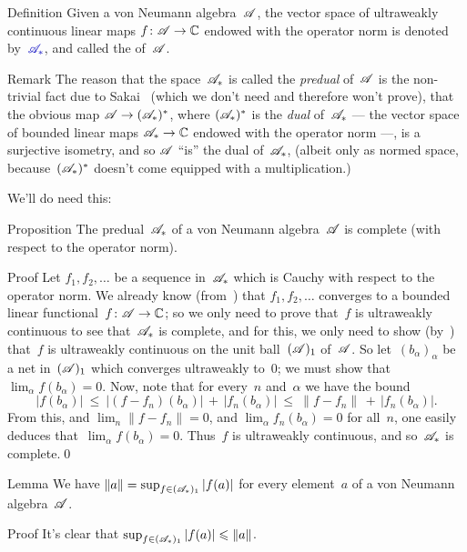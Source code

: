 \documentclass[a]{subfiles}
\begin{document}
\begin{parsec}%
\begin{point}{Definition}%
Given a von Neumann algebra~$\mathscr{A}$,
the vector space of ultraweakly continuous 
linear maps $f\colon \mathscr{A}\to \mathbb{C}$
endowed with the operator norm
is denoted by~$\Define{\scrA_*}$,
and called the  of~$\mathscr{A}$.
\begin{point}{Remark}%
The reason
that the space~$\mathscr{A}_*$ is called the \emph{predual}
of~$\mathscr{A}$
is the non-trivial fact due to Sakai~\cite{sakai} (which we 
don't need and therefore won't prove),
that the obvious 
map $\mathscr{A}\to(\mathscr{A}_*)^*$,
where $(\mathscr{A}_*)^*$ is the \emph{dual} of~$\mathscr{A}_*$ --- the
vector space of bounded linear maps $\mathscr{A}_*\to\mathbb{C}$
endowed with the operator norm ---,
is a surjective isometry,
and so $\mathscr{A}$ ``is'' the dual of~$\mathscr{A}_*$,
(albeit only as normed space,
because~$(\mathscr{A}_*)^*$ doesn't come equipped with a multiplication.)

We'll do need this:
\end{point}
\end{point}
\begin{point}{Proposition}%
The predual~$\mathscr{A}_*$ of a von Neumann algebra~$\mathscr{A}$
is complete (with respect to the operator norm).
\begin{point}{Proof}%
Let $f_1,f_2,\dotsc$ be a sequence in~$\mathscr{A}_*$
which is Cauchy with respect to the operator norm.
We already know (from~)
that $f_1,f_2,\dotsc$ converges to a bounded linear 
functional~$f\colon \mathscr{A}\to\mathbb{C}$;
so we only need to prove that~$f$ is ultraweakly continuous
to see that~$\mathscr{A}_*$ is complete,
and for this,
we only need to show 
(by~)
that~$f$
is ultraweakly continuous
on the unit ball~$(\mathscr{A})_1$ of~$\mathscr{A}$.
So let~$(b_\alpha)_\alpha$ be 
a net in~$(\mathscr{A})_1$
which converges ultraweakly to~$0$;
we must show that~$\lim_\alpha f(b_\alpha)=0$.
Now, note that for every~$n$ and~$\alpha$
we have the bound
\begin{equation*}
	\left|f(b_\alpha)\right|
	\ \leq\ \left|(f-f_n)(b_\alpha)\right|
	\,+\,\left|f_n(b_\alpha)\right|
	\ \leq\ 
	\|f-f_n\|\,+\,\left|f_n(b_\alpha)\right|.
\end{equation*}
From this,
and $\lim_n\|f-f_n\|=0$,
and $\lim_\alpha f_n(b_\alpha)=0$
for all~$n$,
one easily deduces that~$\lim_\alpha f(b_\alpha)=0$.
Thus~$f$ is ultraweakly continuous,
and so~$\mathscr{A}_*$ is complete.\qed
\end{point}
\end{point}
\begin{point}[norm-predual]{Lemma}%
We have $\|a\|=\sup_{f\in(\mathscr{A}_*)_1}\left|f(a)\right|$
for every element~$a$ of a von Neumann algebra~$\mathscr{A}$.
\begin{point}{Proof}%
It's clear that $\sup_{f\in(\mathscr{A}_*)_1}\left|f(a)\right|\leqslant \|a\|$.


\end{point}
\end{point}
\end{parsec}
\end{document}
